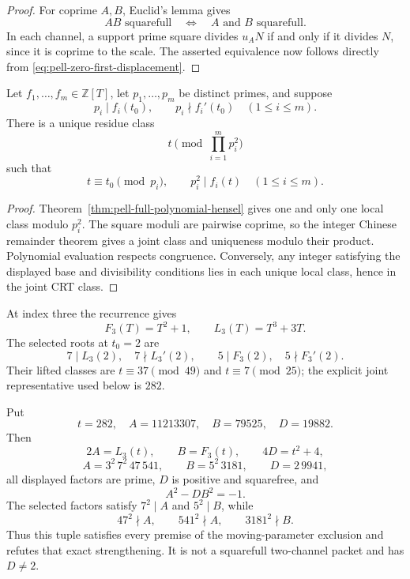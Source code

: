 \begin{proof}
For coprime $A,B$, Euclid's lemma gives
\[
 AB\text{ squarefull}
 \quad\Longleftrightarrow\quad
 A\text{ and }B\text{ squarefull}.
\]
In each channel, a support prime square divides $u_AN$ if and only if it
divides $N$, since it is coprime to the scale.  The asserted equivalence now
follows directly from \eqref{eq:pell-zero-first-displacement}.
\end{proof}

\begin{theorem}
\label{thm:pell-finite-indexed-steering}
Let $f_1,\ldots,f_m\in\mathbb Z[T]$, let $p_1,\ldots,p_m$ be distinct
primes, and suppose
\[
 p_i\mid f_i(t_0),\qquad p_i\nmid f_i'(t_0)
 \quad(1\leq i\leq m).
\]
There is a unique residue class
\[
 t\pmod{\prod_{i=1}^m p_i^2}
\]
such that
\[
 t\equiv t_0\pmod {p_i},\qquad p_i^2\mid f_i(t)
 \quad(1\leq i\leq m).
\]
\end{theorem}

\begin{proof}
Theorem~\ref{thm:pell-full-polynomial-hensel} gives one and only one local
class modulo $p_i^2$.  The square moduli are pairwise coprime, so the integer
Chinese remainder theorem gives a joint class and uniqueness modulo their
product.  Polynomial evaluation respects congruence.  Conversely, any
integer satisfying the displayed base and divisibility conditions lies in
each unique local class, hence in the joint CRT class.
\end{proof}

At index three the recurrence gives
\[
 F_3(T)=T^2+1,\qquad L_3(T)=T^3+3T.
\]
The selected roots at $t_0=2$ are
\[
 7\mid L_3(2),\quad 7\nmid L_3'(2),\qquad
 5\mid F_3(2),\quad 5\nmid F_3'(2).
\]
Their lifted classes are $t\equiv37\pmod {49}$ and
$t\equiv7\pmod {25}$; the explicit joint representative used below is $282$.

\begin{proposition}
\label{prop:pell-complete-moving-witness}
Put
\[
 t=282,\quad A=11213307,\quad B=79525,\quad D=19882.
\]
Then
\[
 2A=L_3(t),\qquad B=F_3(t),\qquad 4D=t^2+4,
\]
\[
 A=3^2\,7^2\,47\,541,\qquad
 B=5^2\,3181,\qquad D=2\,9941,
\]
all displayed factors are prime, $D$ is positive and squarefree, and
\[
 A^2-DB^2=-1.
\]
The selected factors satisfy $7^2\mid A$ and $5^2\mid B$, while
\[
 47^2\nmid A,\qquad541^2\nmid A,
 \qquad3181^2\nmid B.
\]
Thus this tuple satisfies every premise of the moving-parameter exclusion
and refutes that exact strengthening.  It is not a squarefull two-channel
packet and has $D\neq2$.
\end{proposition}

